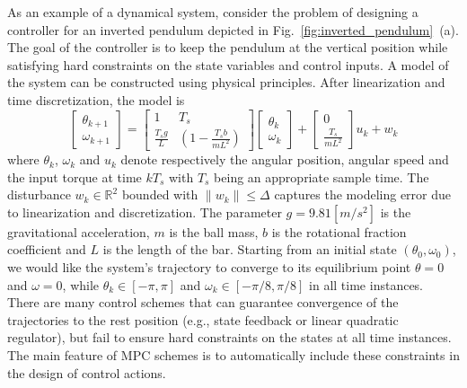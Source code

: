 As an example of a dynamical system, consider the problem of designing a controller for an inverted pendulum depicted in Fig.~\ref{fig:inverted_pendulum}~{(a)}.
The goal of the controller is to keep the pendulum at the vertical position while satisfying hard constraints on the state variables and control inputs.
A model of the system can be constructed using physical principles. After linearization and time discretization, the model is
	\begin{equation}
		\begin{bmatrix}
			 \theta_{k+1}\\
			\omega_{k+1}
		\end{bmatrix}=
		\begin{bmatrix}
			1 & T_s\\
			\frac{T_sg}{L}& (1-\frac{T_sb}{mL^2})		
		\end{bmatrix}
		\begin{bmatrix}
			\theta_k\\
			\omega_k
		\end{bmatrix}+
		\begin{bmatrix}
			0\\
			\frac{T_s}{mL^2}
		\end{bmatrix}u_k + w_k
		\label{eq:pendul_ss}
	\end{equation}
	where $\theta_k$, $\omega_k$ and $u_k$ denote respectively the angular position, angular speed and the input torque at time $kT_s$ with $T_s$ being an appropriate sample time.
	The disturbance $w_k\in\mathbb R^2$ bounded with $\|w_k\|\leq \Delta$ captures the modeling error due to linearization and discretization. The parameter $g=9.81 [m/s^2]$ is the gravitational acceleration, $m$ is the ball mass, $b$ is the rotational fraction coefficient and $L$ is the length of the bar. Starting from an initial state $(\theta_0,\omega_0)$, we would like the system's trajectory to converge to its equilibrium point $\theta=0$ and $\omega=0$, while $\theta_k\in[-\pi,\pi]$ and $\omega_k\in[-\pi/8,\pi/8]$ in all time instances.\\
	There are many control schemes that can guarantee convergence of the trajectories to the rest position (e.g., state feedback or linear quadratic regulator), but fail to ensure hard constraints on the states at all time instances. The main feature of MPC schemes is to automatically include these constraints in the design of control actions.
